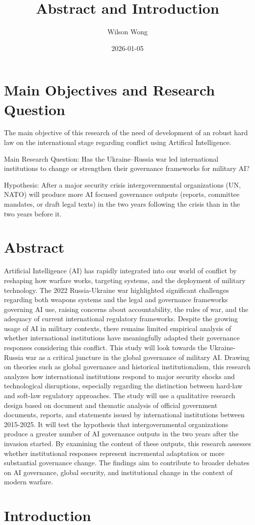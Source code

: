 \documentclass[
  letterpaper,
  DIV=11,
  numbers=noendperiod]{scrartcl}
\title{Abstract and Introduction}
\author{Wilson Wong}
\date{2026-01-05}
\begin{document}
\maketitle

\section{Main Objectives and Research
Question}\label{main-objectives-and-research-question}

The main objective of this research of the need of development of an
robust hard law on the international stage regarding conflict using
Artifical Intelligence.

Main Research Question: Has the Ukraine--Russia war led international
institutions to change or strengthen their governance frameworks for
military AI?

Hypothesis: After a major security crisis intergovernmental
organizations (UN, NATO) will produce more AI focused governance outputs
(reports, committee mandates, or draft legal texts) in the two years
following the crisis than in the two years before it.

\section{Abstract}\label{abstract}

Artificial Intelligence (AI) has rapidly integrated into our world of
conflict by reshaping how warfare works, targeting systems, and the
deployment of military technology. The 2022 Russia-Ukraine war
highlighted significant challenges regarding both weapons systems and
the legal and governance frameworks governing AI use, raising concerns
about accountability, the rules of war, and the adequacy of current
international regulatory frameworks. Despite the growing usage of AI in
military contexts, there remains limited empirical analysis of whether
international institutions have meaningfully adapted their governance
responses considering this conflict. This study will look towards the
Ukraine-Russia war as a critical juncture in the global governance of
military AI. Drawing on theories such as global governance and
historical institutionalism, this research analyzes how international
institutions respond to major security shocks and technological
disruptions, especially regarding the distinction between hard-law and
soft-law regulatory approaches. The study will use a qualitative
research design based on document and thematic analysis of official
government documents, reports, and statements issued by international
institutions between 2015-2025. It will test the hypothesis that
intergovernmental organizations produce a greater number of AI
governance outputs in the two years after the invasion started. By
examining the content of these outputs, this research assesses whether
institutional responses represent incremental adaptation or more
substantial governance change. The findings aim to contribute to broader
debates on AI governance, global security, and institutional change in
the context of modern warfare.

\section{Introduction}\label{introduction}
\end{document}
